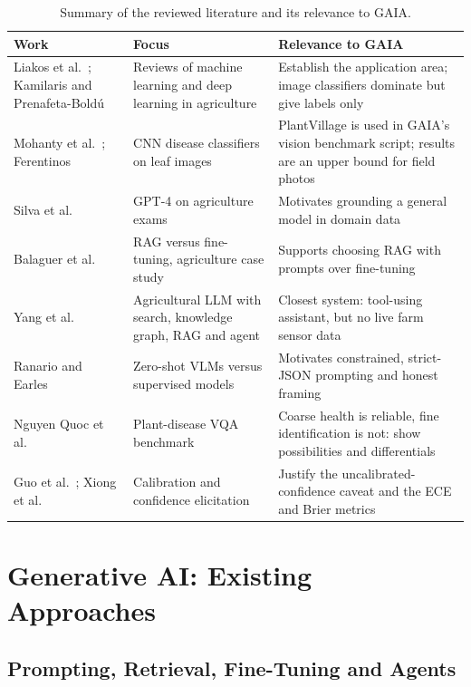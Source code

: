 \begin{table}[H]
\centering
\caption{Summary of the reviewed literature and its relevance to GAIA.}
\label{tab:litsummary}
\small
\begin{tabular}{|P{2.4cm}|P{4.0cm}|P{5.9cm}|}
\hline
\textbf{Work} & \textbf{Focus} & \textbf{Relevance to GAIA}\\\hline
Liakos et al.~\cite{liakos2018ml}; Kamilaris and Prenafeta-Bold{\'u}~\cite{kamilaris2018deep} & Reviews of machine learning and deep learning in agriculture & Establish the application area; image classifiers dominate but give labels only\\\hline
Mohanty et al.~\cite{mohanty2016plantvillage}; Ferentinos~\cite{ferentinos2018deep} & CNN disease classifiers on leaf images & PlantVillage is used in GAIA's vision benchmark script; results are an upper bound for field photos\\\hline
Silva et al.~\cite{silva2023gpt4agronomist} & GPT-4 on agriculture exams & Motivates grounding a general model in domain data\\\hline
Balaguer et al.~\cite{balaguer2024ragvsft} & RAG versus fine-tuning, agriculture case study & Supports choosing RAG with prompts over fine-tuning\\\hline
Yang et al.~\cite{yang2024shizishangpt} & Agricultural LLM with search, knowledge graph, RAG and agent & Closest system: tool-using assistant, but no live farm sensor data\\\hline
Ranario and Earles~\cite{ranario2025vlmag} & Zero-shot VLMs versus supervised models & Motivates constrained, strict-JSON prompting and honest framing\\\hline
Nguyen Quoc et al.~\cite{nguyen2026leafnet} & Plant-disease VQA benchmark & Coarse health is reliable, fine identification is not: show possibilities and differentials\\\hline
Guo et al.~\cite{guo2017calibration}; Xiong et al.~\cite{xiong2024uncertainty} & Calibration and confidence elicitation & Justify the uncalibrated-confidence caveat and the ECE and Brier metrics\\\hline
\end{tabular}
\end{table}

\section{Generative AI: Existing Approaches}

\subsection{Prompting, Retrieval, Fine-Tuning and Agents}

